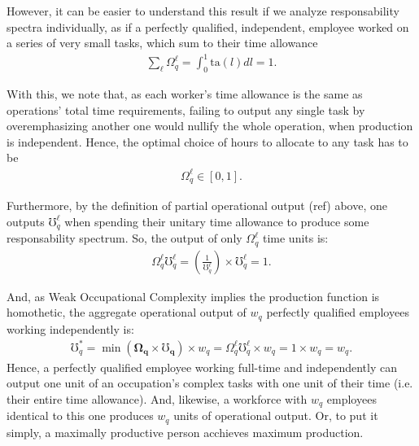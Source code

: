 \documentclass[hidelinks, nonatbib]{elsarticle}
\begin{document}
\begin{enumerate}
    However, it can be easier to understand this result if we analyze responsability spectra individually, as if a perfectly qualified, independent, employee worked on a series of very small tasks, which sum to their time allowance
    \begin{gather}
        \sum_{\ell}^{}{
            \Omega_{q}^{\ell}
        }
        = 
        \int_{0}^{1}{
            \text{ta}(l)
            dl
        }
        =
        1
        .
    \end{gather}
    
    With this, we note that, as each worker's time allowance is the same as operations' total time requirements, failing to output any single task by overemphasizing another one would nullify the whole operation, when production is independent. Hence, the optimal choice of hours to allocate to any task has to be
    \begin{gather}
        \Omega_{q}^{\ell} 
        \in
        [0,1]
        .
    \end{gather}

    Furthermore, by the definition of partial operational output (ref) above, one outputs $\mho_{q}^{\ell}$ when spending their unitary time allowance to produce some responsability spectrum. So, the output of only $\Omega_{q}^{\ell}$ time units is:
    \begin{gather}
        \Omega_{q}^{\ell}
        \mho_{q}^{\ell}
        =
        \left(
            \frac{1}{\mho_{q}^{\ell}}
        \right)
        \times
        \mho_{q}^{\ell}
        =
        1
        .
    \end{gather}
    
    And, as Weak Occupational Complexity implies the production function is homothetic, the aggregate operational output of $w_q$ perfectly qualified employees working independently is:
    \begin{gather}
        \mho_{q}^{*}
        =
        \min(
            \boldsymbol{\Omega_q}
            \times
            \boldsymbol{\mho_q}
        )
        \times
        w_q
        =
        \Omega_{q}^{\ell}
        \mho_{q}^{\ell}
        \times
        w_q
        =
        1
        \times
        w_q
        =
        w_q
        .
    \end{gather}
    Hence, a perfectly qualified employee working full-time and independently can output one unit of an occupation's complex tasks with one unit of their time (i.e. their entire time allowance). And, likewise, a workforce with $w_q$ employees identical to this one produces $w_q$ units of operational output. Or, to put it simply, a maximally productive person acchieves maximum production.
    

\end{enumerate}
\end{document}
